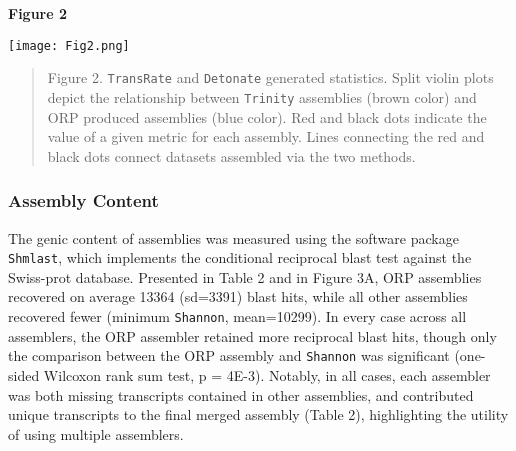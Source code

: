 \documentclass[10pt,letterpaper]{article}
\begin{document}
\textbf{\hypertarget{Figure 2}{Figure 2}} \\
\centerline{\texttt{[image: Fig2.png]}}
\begin{quote}
\small{Figure 2. \texttt{TransRate} and \texttt{Detonate} generated statistics. Split violin plots depict the relationship between \texttt{Trinity} assemblies (brown color) and ORP produced assemblies (blue color). Red and black dots indicate the value of a given metric for each assembly. Lines connecting the red and black dots connect datasets assembled via the two methods.}
\end{quote} 

\subsubsection{Assembly Content}

The genic content of assemblies was measured using the software package \texttt{Shmlast}, which implements the conditional reciprocal blast test against the Swiss-prot database. Presented in Table 2 and in Figure 3A, ORP assemblies recovered on average 13364 (sd=3391) blast hits, while all other assemblies recovered fewer (minimum \texttt{Shannon}, mean=10299). In every case across all assemblers, the ORP assembler retained more reciprocal blast hits, though only the comparison between the ORP assembly and \texttt{Shannon} was significant (one-sided Wilcoxon rank sum test, p = 4E-3). Notably, in all cases, each assembler was both missing transcripts contained in other assemblies, and contributed unique transcripts to the final merged assembly (Table 2), highlighting the utility of using multiple assemblers. \\
\end{document}
